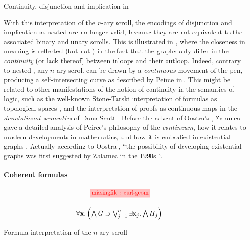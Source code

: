 \begin{marginfigure}
  
  \caption{Continuity, disjunction and implication in }
\end{marginfigure}

With this interpretation of the $n$-ary scroll, the  encodings of
disjunction and implication as nested  are no longer valid, because they are
not  equivalent to the associated binary and unary scrolls.
This is illustrated in , where the closeness in meaning is
reflected  (but not ) in the fact that the graphs only
differ in the \emph{continuity} (or lack thereof) between inloops and their
outloop. Indeed, contrary to nested , any $n$-ary scroll can be drawn by a
\emph{continuous} movement of the pen, producing a self-intersecting curve as
described by Peirce in \cite{peirce_prolegomena_1906}. This might be related to
other manifestations of the notion of continuity in the semantics of
 logic, such as the well-known Stone-Tarski interpretation of
formulas as topological spaces \cite{stone_topological_1938}, and the
interpretation of proofs as continuous maps in the \emph{denotational semantics}
of Dana Scott . Before the advent of Oostra's
, Zalamea gave a detailed analysis of Peirce's philosophy of
the \emph{continuum}, how it relates to modern developments in mathematics, and
how it is embodied in existential graphs \cite{zalamea_peirces_2003}. Actually
according to Oostra , ``the
possibility of developing  existential graphs was first suggested
by Zalamea in the 1990s \cite{zalamea_ieg_1,zalamea_ieg_2}''.

\paragraph{Coherent formulas}

\begin{marginfigure}
  $$
  \!\!\!\!
  \!\!\!\!
  \!\!\!\!
  \begin{array}{c}
    \tikzfig{0.85}{0.85}{curl-geom} \vspace{1.5em}\\
    \forall \bx. \left(\bigwedge G \limp \bigvee_{j = 1}^{n}\exists \bx_j. \bigwedge H_j\right)
  \end{array}
  $$
  \caption{Formula interpretation of the $n$-ary scroll}
\end{marginfigure}

